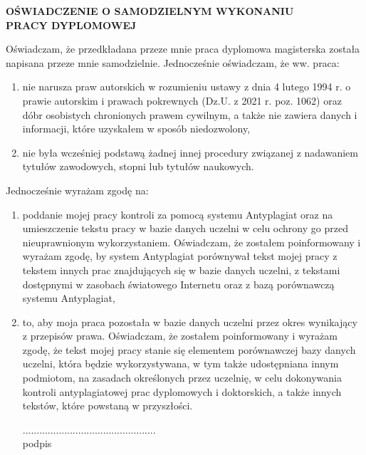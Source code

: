 \begingroup
\thispagestyle{empty}
\begin{footnotesize}
\begin{center}
    \large\textbf{OŚWIADCZENIE O SAMODZIELNYM WYKONANIU\\PRACY DYPLOMOWEJ}
\end{center}

Oświadczam, że przedkładana przeze mnie praca dyplomowa magisterska została
napisana przeze mnie samodzielnie. Jednocześnie oświadczam, że ww. praca:

\begin{enumerate}
    \item nie narusza praw autorskich w rozumieniu ustawy z dnia 4 lutego
    1994 r. o prawie autorskim i prawach pokrewnych (Dz.U. z 2021 r. poz. 1062)
    oraz dóbr osobistych chronionych prawem cywilnym, a także nie zawiera danych
    i informacji, które uzyskałem w sposób niedozwolony,
    \item nie była wcześniej podstawą żadnej innej procedury związanej z
    nadawaniem tytułów zawodowych, stopni lub tytułów naukowych.
\end{enumerate}

Jednocześnie wyrażam zgodę na:

\begin{enumerate}
    \item poddanie mojej pracy kontroli za pomocą systemu Antyplagiat oraz na
    umieszczenie tekstu pracy w bazie danych uczelni w celu ochrony go przed
    nieuprawnionym wykorzystaniem. Oświadczam, że zostałem poinformowany i
    wyrażam zgodę, by system Antyplagiat porównywał tekst mojej pracy z tekstem
    innych prac znajdujących się w bazie danych uczelni, z tekstami dostępnymi
    w zasobach światowego Internetu oraz z bazą porównawczą systemu
    Antyplagiat,
    \item to, aby moja praca pozostała w bazie danych uczelni przez okres
    wynikający z przepisów prawa. Oświadczam, że zostałem poinformowany i
    wyrażam zgodę, że tekst mojej pracy stanie się elementem porównawczej bazy
    danych uczelni, która będzie wykorzystywana, w tym także udostępniana innym
    podmiotom, na zasadach określonych przez uczelnię, w celu dokonywania
    kontroli antyplagiatowej prac dyplomowych i doktorskich, a także innych
    tekstów, które powstaną w przyszłości.

    \begin{flushright}
    ................................................\\
    podpis
    \end{flushright}


\end{enumerate}
\end{footnotesize}
